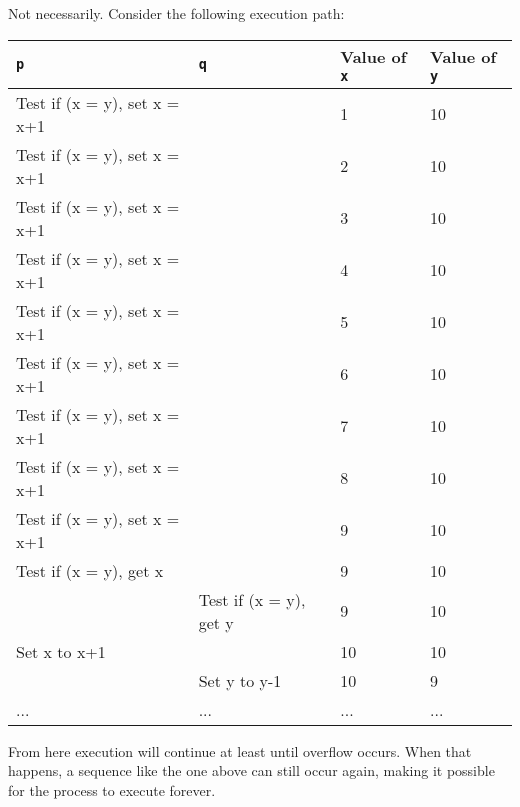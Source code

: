 Not necessarily. Consider the following execution path:

\begin{tabular}{|l|l|l|l|}
\hline
\texttt{p} & \texttt{q} & Value of \texttt{x} & Value of \texttt{y} \\
\hline
Test if (x = y), set x = x+1 & & 1 & 10 \\
\hline
Test if (x = y), set x = x+1 & & 2 & 10 \\
\hline
Test if (x = y), set x = x+1 & & 3 & 10 \\
\hline
Test if (x = y), set x = x+1 & & 4 & 10 \\
\hline
Test if (x = y), set x = x+1 & & 5 & 10 \\
\hline
Test if (x = y), set x = x+1 & & 6 & 10 \\
\hline
Test if (x = y), set x = x+1 & & 7 & 10 \\
\hline
Test if (x = y), set x = x+1 & & 8 & 10 \\
\hline
Test if (x = y), set x = x+1 & & 9 & 10 \\
\hline
Test if (x = y), get x & & 9 & 10 \\
\hline
 & Test if (x = y), get y & 9 & 10 \\
\hline
Set x to x+1 & & 10 & 10 \\
\hline
 & Set y to y-1 & 10 & 9 \\
\hline
    ... & ... & ... &... \\
\hline
\end{tabular}

From here execution will continue at least until overflow occurs. When that happens, a sequence like the one above can still occur again, making it possible for the process to execute forever.
